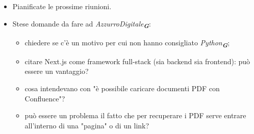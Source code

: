 \begin{itemize}
    \item Pianificate le prossime riunioni.
    \item Stese domande da fare ad \emph{AzzurroDigitale}\textsubscript{\textit{\textbf{G}}}:
    \begin{itemize}
        \item chiedere se c'è un motivo per cui non hanno consigliato \emph{Python}\textsubscript{\textit{\textbf{G}}};
        \item citare Next.js come framework full-stack (sia backend sia frontend): può essere un vantaggio?
        \item cosa intendevano con "è possibile caricare documenti PDF con Confluence"? 
        \item può essere un problema il fatto che per recuperare i PDF serve entrare all'interno di una "pagina" o di un link?
    \end{itemize}








\end{itemize}